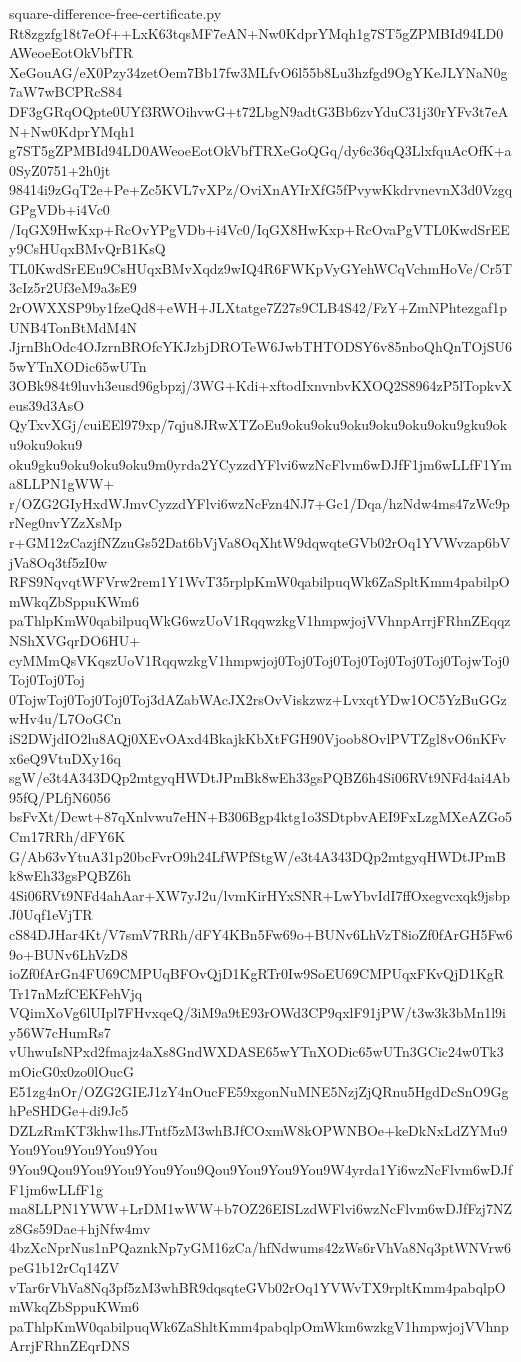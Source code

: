 \documentclass[11pt]{article}
\theoremstyle{definition}
\theoremstyle{remark}
\begin{document}
\begin{filecontents*}[overwrite]{square-difference-free-certificate.py}
Rt8zgzfg18t7eOf++LxK63tqsMF7eAN+Nw0KdprYMqh1g7ST5gZPMBId94LD0AWeoeEotOkVbfTR
XeGouAG/eX0Pzy34zetOem7Bb17fw3MLfvO6l55b8Lu3hzfgd9OgYKeJLYNaN0g7aW7wBCPRcS84
DF3gGRqOQpte0UYf3RWOihvwG+t72LbgN9adtG3Bb6zvYduC31j30rYFv3t7eAN+Nw0KdprYMqh1
g7ST5gZPMBId94LD0AWeoeEotOkVbfTRXeGoQGq/dy6c36qQ3LlxfquAcOfK+a0SyZ0751+2h0jt
98414i9zGqT2e+Pe+Zc5KVL7vXPz/OviXnAYIrXfG5fPvywKkdrvnevnX3d0VzgqGPgVDb+i4Vc0
/IqGX9HwKxp+RcOvYPgVDb+i4Vc0/IqGX8HwKxp+RcOvaPgVTL0KwdSrEEy9CsHUqxBMvQrB1KsQ
TL0KwdSrEEu9CsHUqxBMvXqdz9wIQ4R6FWKpVyGYehWCqVchmHoVe/Cr5T3cIz5r2Uf3eM9a3sE9
2rOWXXSP9by1fzeQd8+eWH+JLXtatge7Z27s9CLB4S42/FzY+ZmNPhtezgaf1pUNB4TonBtMdM4N
JjrnBhOdc4OJzrnBROfcYKJzbjDROTeW6JwbTHTODSY6v85nboQhQnTOjSU65wYTnXODic65wUTn
3OBk984t9luvh3eusd96gbpzj/3WG+Kdi+xftodIxnvnbvKXOQ2S8964zP5lTopkvXeus39d3AsO
QyTxvXGj/cuiEEl979xp/7qju8JRwXTZoEu9oku9oku9oku9oku9oku9oku9gku9oku9oku9oku9
oku9gku9oku9oku9oku9m0yrda2YCyzzdYFlvi6wzNcFlvm6wDJfF1jm6wLLfF1Yma8LLPN1gWW+
r/OZG2GIyHxdWJmvCyzzdYFlvi6wzNcFzn4NJ7+Gc1/Dqa/hzNdw4ms47zWc9prNeg0nvYZzXsMp
r+GM12zCazjfNZzuGs52Dat6bVjVa8OqXhtW9dqwqteGVb02rOq1YVWvzap6bVjVa8Oq3tf5zI0w
RFS9NqvqtWFVrw2rem1Y1WvT35rplpKmW0qabilpuqWk6ZaSpltKmm4pabilpOmWkqZbSppuKWm6
paThlpKmW0qabilpuqWkG6wzUoV1RqqwzkgV1hmpwjojVVhnpArrjFRhnZEqqzNShXVGqrDO6HU+
cyMMmQsVKqszUoV1RqqwzkgV1hmpwjoj0Toj0Toj0Toj0Toj0Toj0Toj0TojwToj0Toj0Toj0Toj
0TojwToj0Toj0Toj0Toj3dAZabWAcJX2rsOvViskzwz+LvxqtYDw1OC5YzBuGGzwHv4u/L7OoGCn
iS2DWjdIO2lu8AQj0XEvOAxd4BkajkKbXtFGH90Vjoob8OvlPVTZgl8vO6nKFvx6eQ9VtuDXy16q
sgW/e3t4A343DQp2mtgyqHWDtJPmBk8wEh33gsPQBZ6h4Si06RVt9NFd4ai4Ab95fQ/PLfjN6056
bsFvXt/Dcwt+87qXnlvwu7eHN+B306Bgp4ktg1o3SDtpbvAEI9FxLzgMXeAZGo5Cm17RRh/dFY6K
G/Ab63vYtuA31p20bcFvrO9h24LfWPfStgW/e3t4A343DQp2mtgyqHWDtJPmBk8wEh33gsPQBZ6h
4Si06RVt9NFd4ahAar+XW7yJ2u/lvmKirHYxSNR+LwYbvIdI7ffOxegvcxqk9jsbpJ0Uqf1eVjTR
cS84DJHar4Kt/V7smV7RRh/dFY4KBn5Fw69o+BUNv6LhVzT8ioZf0fArGH5Fw69o+BUNv6LhVzD8
ioZf0fArGn4FU69CMPUqBFOvQjD1KgRTr0Iw9SoEU69CMPUqxFKvQjD1KgRTr17nMzfCEKFehVjq
VQimXoVg6lUIpl7FHvxqeQ/3iM9a9tE93rOWd3CP9qxlF91jPW/t3w3k3bMn1l9iy56W7cHumRs7
vUhwuIsNPxd2fmajz4aXs8GndWXDASE65wYTnXODic65wUTn3GCic24w0Tk3mOicG0x0zo0lOucG
E51zg4nOr/OZG2GIEJ1zY4nOucFE59xgonNuMNE5NzjZjQRnu5HgdDcSnO9GghPeSHDGe+di9Jc5
DZLzRmKT3khw1hsJTntf5zM3whBJfCOxmW8kOPWNBOe+keDkNxLdZYMu9You9You9You9You9You
9You9Qou9You9You9You9You9Qou9You9You9You9W4yrda1Yi6wzNcFlvm6wDJfF1jm6wLLfF1g
ma8LLPN1YWW+LrDM1wWW+b7OZ26EISLzdWFlvi6wzNcFlvm6wDJfFzj7NZz8Gs59Dae+hjNfw4mv
4bzXcNprNus1nPQaznkNp7yGM16zCa/hfNdwums42zWs6rVhVa8Nq3ptWNVrw6peG1b12rCq14ZV
vTar6rVhVa8Nq3pf5zM3whBR9dqsqteGVb02rOq1YVWvTX9rpltKmm4pabqlpOmWkqZbSppuKWm6
paThlpKmW0qabilpuqWk6ZaShltKmm4pabqlpOmWkm6wzkgV1hmpwjojVVhnpArrjFRhnZEqrDNS

\end{filecontents*}
\end{document}
